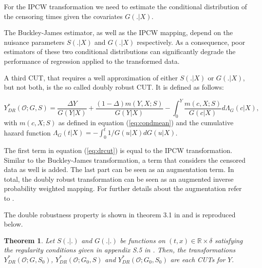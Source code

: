 \documentclass[12pt, a4paper]{article}
\theoremstyle{definition}
\theoremstyle{plain}
\newtheorem{Theorem}{Theorem}[section]
\numberwithin{equation}{section}
\numberwithin{figure}{section}
\numberwithin{table}{section}
\begin{document}
	
	For the IPCW transformation we need to estimate the conditional distribution of the censoring times given the covariates $G(.\vert X)$.
	
	

	The Buckley-James estimator, as well as the IPCW mapping, depend on the nuisance parameters $S(. \vert X)$ and $G(.\vert X)$ respectively.
	As a consequence, poor estimators of these two conditional distributions can significantly degrade the performance of regression applied to the transformed data.
	
	A third CUT, that requires a well approximation of either  $S(. \vert X)$ or $G(.\vert X)$, but not both, is the so called doubly robust CUT.
	It is defined as follows:
	
	\begin{equation}\label{eq:drcut}
	Y_{DR}^* (\mathcal{O}; G, S) = \frac{\Delta Y}{G(Y\vert X)} + \frac{(1-\Delta)m(Y,X;S)}{G(Y \vert X)} - \int_{0}^{Y} \frac{m(c,X;S)}{G(c \vert X)} d\Lambda_G(c \vert X),
	\end{equation}
	with $m(c,X;S)$ as defined in equation (\ref{eq:condmean}) and the cumulative hazard function $\Lambda_G(t\vert X)=-\int_{0}^{t}1/G(u\vert X)dG(u\vert X)$.
	
	The first term in equation (\ref{eq:drcut}) is equal to the IPCW transformation.
	Similar to the Buckley-James transformation, a term that considers the censored data as well is added.
	The last part can be seen as an augmentation term.
	In total, the doubly robust transformation can be seen as an augmented inverse probability weighted mapping.
	For further details about the augmentation refer to \citet*{bookfailuretime}.
		
	The double robustness property is shown in theorem 3.1 in \citet*{culs} and is reproduced below.
	
	\begin{Theorem}\label{thm:dr}
		Let $S(. \vert .)$ and $G(.\vert .)$ be functions on $(t,x)\in \mathbb{R} \times \delta$ satisfying the regularity conditions given in appendix S.5 in \citet*{culs}. Then, the transformations $Y_{DR}^* (\mathcal{O}; G, S_0)$, $Y_{DR}^* (\mathcal{O}; G_0, S)$ and $Y_{DR}^* (\mathcal{O}; G_0, S_0)$ are each CUTs for $Y$.
	\end{Theorem}
\end{document}
